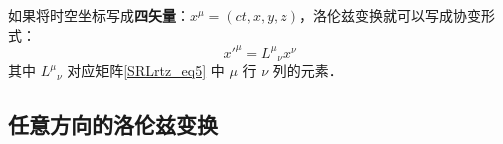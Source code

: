 如果将时空坐标写成\textbf{四矢量}：$x^{\mu}=(ct,x,y,z)$，洛伦兹变换就可以写成协变形式：
\begin{equation}
x'^{\mu}={L^\mu}_\nu x^\nu
\end{equation}
其中 ${L^\mu}_\nu$ 对应矩阵\autoref{SRLrtz_eq5} 中 $\mu$ 行 $\nu$ 列的元素．
\subsection{任意方向的洛伦兹变换}
